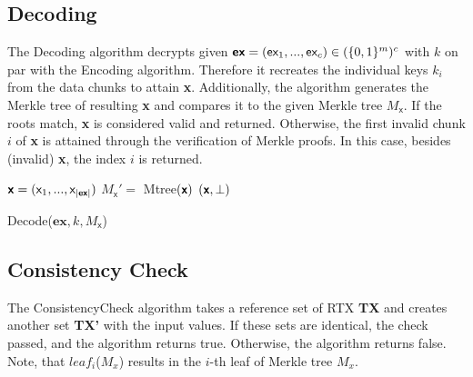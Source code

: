 \documentclass{cacthesis}
\begin{document}
        \subsection{Decoding}
        The \textsf{Decoding} algorithm decrypts given $\textsf{\textbf{ex}} = (\textsf{ex}_1, ..., \textsf{ex}_c) \in (\{0,1\}^m)^c$ with $k$ on par with the Encoding algorithm. Therefore it recreates the individual keys $k_i$ from the data chunks to attain \textsf{\textbf{x}}. Additionally, the algorithm generates the Merkle tree of resulting \textsf{\textbf{x}} and compares it to the given Merkle tree  $M_\textsf{x}$. If the roots match, \textsf{\textbf{x}} is considered valid and returned. Otherwise, the first invalid chunk $i$ of \textsf{\textbf{x}} is attained through the verification of Merkle proofs. In this case, besides (invalid) \textsf{\textbf{x}},  the index $i$ is returned.
        \begin{center}
        \begin{minipage}[t]{4in}
            \begin{algorithm}[H]
                 $\textsf{\textbf{x}} = (\textsf{x}_1,..., \textsf{x}_{|\textsf{\textbf{ex}}|})$\;
                 $M_\textsf{x}' = $ \textsf{Mtree}$(\textsf{\textbf{x}})$\;
                \Return $(\textsf{\textbf{x}}, \perp)$\;
                \caption{\textsf{Decode($\textbf{ex}, k, M_\textsf{x}$)}}
            \end{algorithm}
        \end{minipage}
        \end{center}
        
        \subsection{Consistency Check}
        The \textsf{ConsistencyCheck} algorithm takes a reference set of RTX \textbf{TX} and creates another set \textbf{TX'} with the input values. If these sets are identical, the check passed, and the algorithm returns \textsf{true}. Otherwise, the algorithm returns \textsf{false}. Note, that $leaf_i$($M_x$) results in the $i$-th leaf of Merkle tree $M_x$.
        
\end{document}

